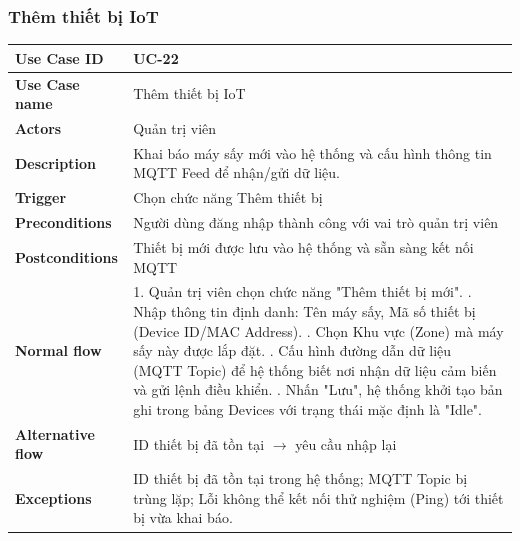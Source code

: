 \subsubsection{Thêm thiết bị IoT}
\begin{tabular}{|p{3.5cm}|p{9.5cm}|}
\hline
\textbf{Use Case ID} & UC-22 \\
\hline
\textbf{Use Case name} & Thêm thiết bị IoT \\
\hline
\textbf{Actors} & Quản trị viên \\
\hline
\textbf{Description} & 
Khai báo máy sấy mới vào hệ thống và cấu hình thông tin MQTT Feed để nhận/gửi dữ liệu. \\
\hline
\textbf{Trigger} & Chọn chức năng Thêm thiết bị \\
\hline
\textbf{Preconditions} & Người dùng đăng nhập thành công với vai trò quản trị viên \\
\hline
\textbf{Postconditions} & Thiết bị mới được lưu vào hệ thống và sẵn sàng kết nối MQTT \\
\hline
\textbf{Normal flow} & 
1. Quản trị viên chọn chức năng "Thêm thiết bị mới". \newline
2. Nhập thông tin định danh: Tên máy sấy, Mã số thiết bị (Device ID/MAC Address). \newline
3. Chọn Khu vực (Zone) mà máy sấy này được lắp đặt. \newline
4. Cấu hình đường dẫn dữ liệu (MQTT Topic) để hệ thống biết nơi nhận dữ liệu cảm biến và gửi lệnh điều khiển. \newline
5. Nhấn "Lưu", hệ thống khởi tạo bản ghi trong bảng Devices với trạng thái mặc định là "Idle". \\
\hline
\textbf{Alternative flow} & 
ID thiết bị đã tồn tại $\rightarrow$ yêu cầu nhập lại \\
\hline
\textbf{Exceptions} & ID thiết bị đã tồn tại trong hệ thống; MQTT Topic bị trùng lặp; Lỗi không thể kết nối thử nghiệm (Ping) tới thiết bị vừa khai báo. \\
\hline
\end{tabular}

